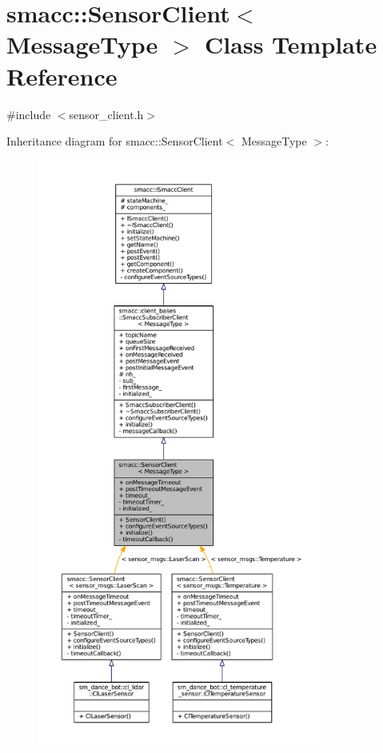 \hypertarget{classsmacc_1_1SensorClient}{}\section{smacc\+:\+:Sensor\+Client$<$ Message\+Type $>$ Class Template Reference}
\label{classsmacc_1_1SensorClient}


{\ttfamily \#include $<$sensor\+\_\+client.\+h$>$}



Inheritance diagram for smacc\+:\+:Sensor\+Client$<$ Message\+Type $>$\+:
\nopagebreak
\begin{figure}[H]
\begin{center}
\leavevmode
\includegraphics[height=550pt]{classsmacc_1_1SensorClient__inherit__graph}
\end{center}
\end{figure}


